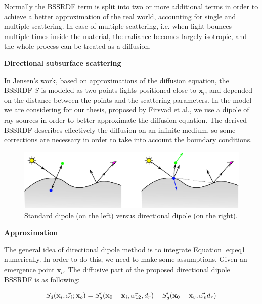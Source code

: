 \documentclass[11pt]{article}
\begin{document}
Normally the BSSRDF term is split
 into two or more additional terms  in order to achieve a better approximation of the real world,
 accounting for single and multiple scattering. In case of multiple scattering, 
i.e. when light bounces multiple times inside the material, the radiance becomes largely isotropic, and the 
whole process can be treated as a diffusion\cite{books/daglib/0093591}.

\vspace{0.6cm}
{\bf Directional subsurface scattering}
\vspace{0.6cm}

In Jensen's work, based on approximations of the diffusion equation, the BSSRDF $S$ is modeled as two 
points lights positioned close to $\mathbf{x}_i$, and depended on the distance between the points and the 
scattering parameters. In the model we are considering for our thesis,
 proposed by Firsvad et al., we use a dipole 
of ray sources in order to better approximate the diffusion equation.
 The derived BSSRDF describes effectively the diffusion on an infinite medium, 
so some corrections are necessary in order to take into account the boundary conditions.

\begin{figure}
\begin{center}
\includegraphics[scale = 0.6]{./images/comparison.eps} 

\caption{Standard dipole (on the left) versus directional dipole (on the right). }
\end{center}
\end{figure}

\vspace{0.6cm}
{\bf Approximation}
\vspace{0.6cm}

The general idea of directional dipole method is to integrate Equation \ref{eq:eq1}
 numerically. In order to do this, we need to make some assumptions. Given an emergence point $\mathbf{x}_o$.
The diffusive part of the
proposed directional dipole BSSRDF is as following:

$$
S_d({\bf x}_i, \vec{\omega_i}; {\bf x}_o)  = S'_d({\bf x}_0 - {\bf x}_i,
\vec{\omega_{12}}, d_r) - S'_d({\bf x}_0 - {\bf x}_v, \vec{\omega_v}
d_r)
$$
\end{document}
